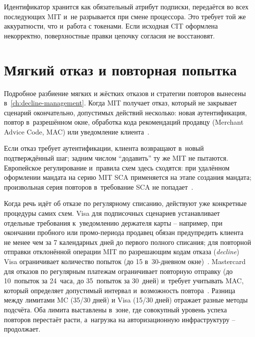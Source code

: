 Идентификатор хранится как обязательный атрибут подписки,
передаётся во всех последующих MIT и~не разрывается при смене
процессора. Это требует той же аккуратности, что и~работа с
токенами. Если исходная CIT оформлена некорректно, поверхностные правки
цепочку согласия не восстановят.

\section{Мягкий отказ и повторная попытка}\label{sec:subscriptions-soft-decline}

Подробное разбиение мягких и жёстких отказов и стратегии повторов вынесены в~\autoref{ch:decline-management}. Когда MIT получает отказ, который не закрывает сценарий окончательно,
допустимых действий несколько: новая аутентификация, повтор
в~разрешённом окне, обработка кода рекомендаций продавцу (Merchant Advice Code, MAC)
или уведомление клиента~\cite{visa-core-rules,mc-tpr}.

Если отказ требует аутентификации, клиента возвращают в~новый
подтверждённый шаг; задним числом \enquote{додавить} ту же MIT
не пытаются. Европейское регулирование и~правила схем здесь сходятся:
при удалённом оформлении мандата на серию MIT SCA применяется на этапе
создания мандата; произвольная серия повторов в~требование SCA
не попадает~\cite{eba-mit-qa,mc-tpr}.

Когда речь идёт об отказе по регулярному списанию, действуют уже
конкретные процедуры самих схем. Visa для подписочных
сценариев устанавливает отдельные требования к~уведомлению держателя
карты -- например, при окончании пробного или промо-периода продавец
обязан предупредить клиента не менее чем за 7 календарных дней
до первого полного списания; для повторной отправки отклонённой
операции MIT по разрешающим кодам отказа (\textit{decline}) Visa
ограничивает количество попыток (до 15 в~30-дневном
окне)~\cite{visa-core-rules}. Mastercard для отказов по
регулярным платежам ограничивает повторную отправку (до 10~попыток
за 24~часа, до 35~попыток за 30~дней) и~требует учитывать MAC, который определяет допустимый интервал
и~возможность повтора~\cite{mc-tpr}. Разница между лимитами
MC (35/30 дней) и Visa (15/30 дней) отражает разные методы подсчёта.
Оба лимита выставлены в~зоне, где совокупный уровень успеха повторов
перестаёт расти, а~нагрузка на авторизационную инфраструктуру --
продолжает.

